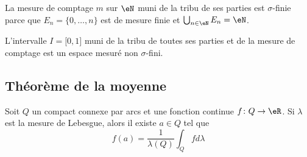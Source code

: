 \begin{example}
	La mesure de comptage \( m\) sur \( \eN\) muni de la tribu de ses parties est \( \sigma\)-finie parce que \( E_n=\{ 0,\ldots, n \}\) est de mesure finie et \( \bigcup_{n\in \eN}E_n=\eN\).
\end{example}

\begin{example}
	L'intervalle \( I=\mathopen[ 0 , 1 \mathclose]\) muni de la tribu de toutes ses parties et de la mesure de comptage est un espace mesuré non \( \sigma\)-fini.
\end{example}

\subsection{Théorème de la moyenne}

\begin{theorem}      \label{ThoooEZLGooMChwLT}
	Soit \( Q\) un compact connexe par arcs et une fonction continue \( f\colon Q\to \eR\). Si \( \lambda\) est la mesure de Lebesgue, alors il existe \( a\in Q\) tel que
	\begin{equation}
		f(a)=\frac{1}{ \lambda(Q) }\int_Qfd\lambda
	\end{equation}
\end{theorem}

